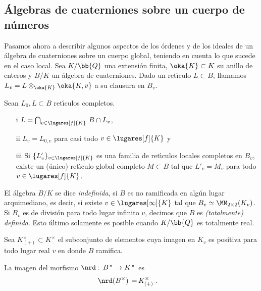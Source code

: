 \subsection{\'{A}lgebras de cuaterniones sobre un cuerpo de n\'{u}meros}
Pasamos ahora a describir algunos aspectos de los \'{o}rdenes y de los
ideales de un \'{a}lgebra de cuaterniones sobre un cuerpo global, teniendo
en cuenta lo que sucede en el caso local. Sea $K/\bb{Q}$ una extensi\'{o}n
finita, $\oka{K}\subset K$ su anillo de enteros y $B/K$ un \'{a}lgebra de
cuaterniones. Dado un ret\'{\i}culo $L\subset B$, llamamos
$L_{v}=L\otimes_{\oka{K}}\oka{K,v}$ a su clausura en $B_{v}$.

\begin{propoLocalGlobalLattices}
 Sean $L_{0},L\subset B$ ret\'{\i}culos completos.
	\begin{itemize}
		\item[i] $L=\bigcap_{v\in\lugares[f]{K}}\,B\cap L_{v}$,
		\item[ii] $L_{v}=L_{0,v}$ para casi todo $v\in\lugares[f]{K}$ y
		\item[iii] Si $\{L'_{v}\}_{v\in\lugares[f]{K}}$ es una familia
			de ret\'{\i}culos locales completos en $B_{v}$,
			existe un (\'{u}nico) ret\'{\i}culo global completo
			$M\subset B$ tal que $L'_{v}=M_{v}$ para todo
			$v\in\lugares[f]{K}$.
	\end{itemize}
\end{propoLocalGlobalLattices}

El \'{a}lgebra $B/K$ se dice \emph{indefinida},
si $B$ es no ramificada
en alg\'{u}n lugar arquimediano, es decir, si existe $v\in\lugares[\infty]{K}$
tal que $B_{v}\simeq\MM_{2\times 2}(K_{v})$. Si $B_{v}$ es de divisi\'{o}n
para todo lugar infinito $v$, decimos que $B$ es \emph{(totalmente) definida}.
Esto \'{u}ltimo solamente es posible cuando $K/\bb{Q}$ es totalmente real.

Sea $K_{(+)}^{\times}\subset K^{\times}$ el subconjunto de
elementos cuya imagen en $K_{v}$ es positiva para todo lugar real $v$
en donde $B$ ramifica.

\begin{teoEichlerNorma}
	La imagen del morfismo $\nrd:\,B^{\times}\rightarrow K^{\times}$ es
	\begin{align*}
		\nrd(B^{\times}) \,=\, & K_{(+)}^{\times}
		\text{ .}
	\end{align*}
\end{teoEichlerNorma}

